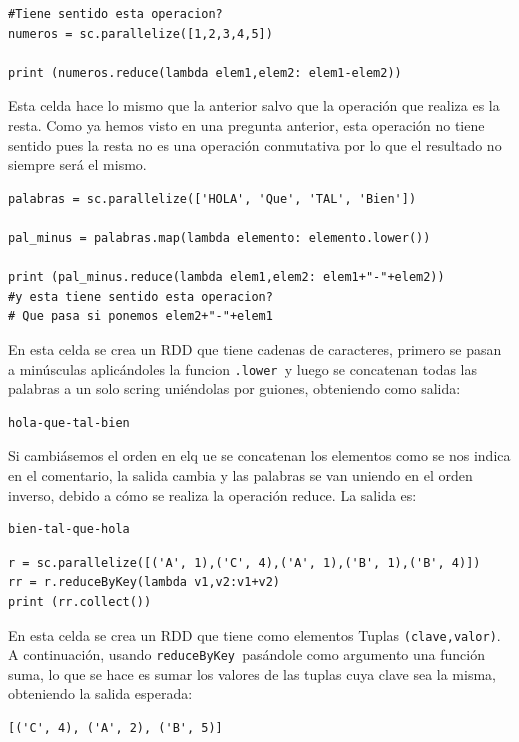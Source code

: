 \documentclass[11pt]{article}
\def\inline{\lstinline[basicstyle=\ttfamily,keywordstyle={}]}
\begin{document}
{{\begin{verbatim}
#Tiene sentido esta operacion?
numeros = sc.parallelize([1,2,3,4,5])

print (numeros.reduce(lambda elem1,elem2: elem1-elem2))
\end{verbatim}

Esta celda hace lo mismo que la anterior salvo que la operación que realiza es la resta. Como ya hemos visto en una pregunta anterior, esta operación no tiene sentido pues la resta no es una operación conmutativa por lo que el resultado no siempre será el mismo.

\begin{verbatim}
palabras = sc.parallelize(['HOLA', 'Que', 'TAL', 'Bien'])

pal_minus = palabras.map(lambda elemento: elemento.lower())

print (pal_minus.reduce(lambda elem1,elem2: elem1+"-"+elem2))
#y esta tiene sentido esta operacion?
# Que pasa si ponemos elem2+"-"+elem1
\end{verbatim}

En esta celda se crea un RDD que tiene cadenas de caracteres, primero se pasan a minúsculas aplicándoles la funcion \inline{.lower }y luego se concatenan todas las palabras a un solo scring uniéndolas por guiones, obteniendo como salida:
\begin{verbatim}
hola-que-tal-bien
\end{verbatim}

Si cambiásemos el orden en elq ue se concatenan los elementos como se nos indica en el comentario, la salida cambia y las palabras se van uniendo en el orden inverso, debido a cómo se realiza la operación reduce. La salida es:
\begin{verbatim}
bien-tal-que-hola
\end{verbatim}

\begin{verbatim}
r = sc.parallelize([('A', 1),('C', 4),('A', 1),('B', 1),('B', 4)])
rr = r.reduceByKey(lambda v1,v2:v1+v2)
print (rr.collect())
\end{verbatim}

En esta celda se crea un RDD que tiene como elementos Tuplas  \inline{(clave,valor)}. A continuación, usando \inline{reduceByKey }pasándole como argumento una función suma, lo que se hace es sumar los valores de las tuplas cuya clave sea la misma, obteniendo la salida esperada:
\begin{verbatim}
[('C', 4), ('A', 2), ('B', 5)]
\end{verbatim}

}}
\end{document}
